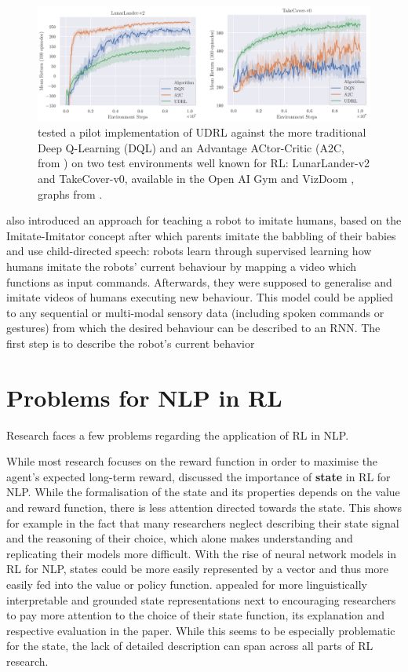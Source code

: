 \documentclass[11pt,a4paper]{article}
\begin{document}
\begin{figure}[ht]
\centering
\includegraphics[scale=.39]{img/udrl_test_image.PNG}
\caption{\citet{srivastava2019training} tested a pilot implementation of UDRL against the more traditional Deep Q-Learning (DQL) and an Advantage ACtor-Critic (A2C, from \citep{mnih-2015}) on two test environments well known for RL: LunarLander-v2 and TakeCover-v0, available in the Open AI Gym and VizDoom \citep{openaigym, vizdoom}, graphs from \citep{srivastava2019training}.}
\end{figure}
\newpage

\cite{schmidhuber2019reinforcement} also introduced an approach for teaching a robot to imitate humans, based on the Imitate-Imitator concept after which parents imitate the babbling of their babies and use child-directed speech: robots learn through supervised learning how humans imitate the robots' current behaviour by mapping a video which functions as input commands. Afterwards, they were supposed to generalise and imitate videos of humans executing new behaviour. This model could be applied to any sequential or multi-modal sensory data (including spoken commands or gestures) from which the desired behaviour can be described to an RNN. The first step is to describe the robot's current behavior 


\section{Problems for NLP in RL}
Research faces a few problems regarding the application of RL in NLP. 

While most research focuses on the reward function in order to maximise the agent's expected long-term reward, \citet{madureira2020} discussed the importance of \textbf{state} in RL for NLP. While the formalisation of the state and its properties depends on the value and reward function, there is less attention directed towards the state. This shows for example in the fact that many researchers neglect describing their state signal and the reasoning of their choice, which alone makes understanding and replicating their models more difficult. With the rise of neural network models in RL for NLP, states could be more easily represented by a vector and thus more easily fed into the value or policy function. \citet{madureira2020} appealed for more linguistically interpretable and grounded state representations next to encouraging researchers to pay more attention to the choice of their state function, its explanation and respective evaluation in the paper. While this seems to be especially problematic for the state, the lack of detailed description can span across all parts of RL research.
\end{document}
